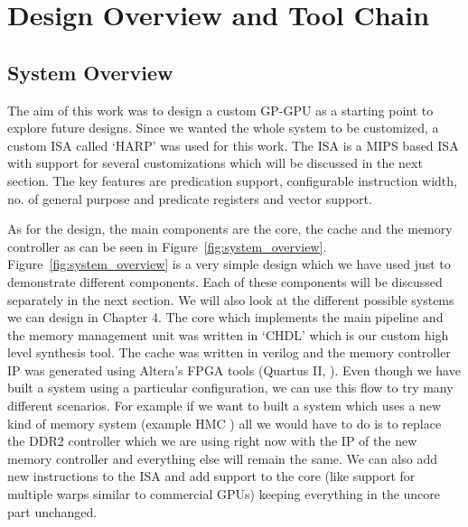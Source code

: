 \setcounter{equation}{0}

\chapter{Design Overview and Tool Chain}
\label{chap: Design Overview and Tool Chain}

\section{ System Overview }
The aim of this work was to design a custom GP-GPU as a starting point to explore future designs. Since we wanted the whole system to be customized, a custom ISA %
called `HARP' was used for this work. The ISA is a MIPS based ISA with support for several customizations which will be discussed in the next section. The key features are predication support, configurable instruction width, no. of general purpose and predicate registers and vector support. 

As for the design, the main components are the core, the cache and the memory controller as can be seen in Figure~\ref{fig:system_overview}. Figure~\ref{fig:system_overview} is a very simple design which we have used just to demonstrate different components. Each of these components will be discussed separately in the next section. We will also look at the different possible systems we can design in Chapter 4. The core which implements the main pipeline and the memory management unit was written in `CHDL' which is our custom high level synthesis tool.%
The cache was written in verilog and the memory controller IP was generated using Altera's FPGA tools (Quartus II, \cite{quartus}). Even though we have built a system using a particular configuration, we can use this flow to try many different scenarios. For example if we want to built a system which uses a new kind of memory system (example HMC \cite{hmc} ) all we would have to do is to replace the DDR2 controller which we are using right now with the IP of the new memory controller and everything else will remain the same. We can also add new instructions to the ISA and add support to the core (like support for multiple warps similar to commercial GPUs) keeping everything in the uncore part unchanged. 
\\

